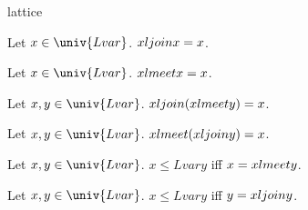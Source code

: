 \documentclass{stex}
\begin{document}
\begin{smodule}{lattice}
  \begin{forthel}
    \begin{proposition}
      Let $x \in \univ{Lvar}$.
      $x \join{Lvar} x = x$.
    \end{proposition}

    \begin{proposition}
      Let $x \in \univ{Lvar}$.
      $x \meet{Lvar} x = x$.
    \end{proposition}

    \begin{proposition}
      Let $x, y \in \univ{Lvar}$.
      $x \join{Lvar} (x \meet{Lvar} y) = x$.
    \end{proposition}

    \begin{proposition}
      Let $x, y \in \univ{Lvar}$.
      $x \meet{Lvar} (x \join{Lvar} y) = x$.
    \end{proposition}

    \begin{proposition}
      Let $x, y \in \univ{Lvar}$.
      $x \leq{Lvar} y$ iff $x = x \meet{Lvar} y$.
    \end{proposition}

    \begin{proposition}
      Let $x, y \in \univ{Lvar}$.
      $x \leq{Lvar}y$ iff $y = x \join{Lvar} y$.
    \end{proposition}
  \end{forthel}
\end{smodule}
\end{document}
